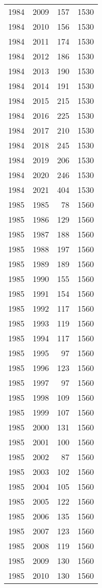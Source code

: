 \documentclass[
  11pt,
  letterpaper,
  DIV=11,
  numbers=noendperiod,
  twoside]{scrartcl}
\begin{document}
\begin{longtable}[]{@{}rrrr@{}}
1984 & 2009 & 157 & 1530 \\
1984 & 2010 & 156 & 1530 \\
1984 & 2011 & 174 & 1530 \\
1984 & 2012 & 186 & 1530 \\
1984 & 2013 & 190 & 1530 \\
1984 & 2014 & 191 & 1530 \\
1984 & 2015 & 215 & 1530 \\
1984 & 2016 & 225 & 1530 \\
1984 & 2017 & 210 & 1530 \\
1984 & 2018 & 245 & 1530 \\
1984 & 2019 & 206 & 1530 \\
1984 & 2020 & 246 & 1530 \\
1984 & 2021 & 404 & 1530 \\
1985 & 1985 & 78 & 1560 \\
1985 & 1986 & 129 & 1560 \\
1985 & 1987 & 188 & 1560 \\
1985 & 1988 & 197 & 1560 \\
1985 & 1989 & 189 & 1560 \\
1985 & 1990 & 155 & 1560 \\
1985 & 1991 & 154 & 1560 \\
1985 & 1992 & 117 & 1560 \\
1985 & 1993 & 119 & 1560 \\
1985 & 1994 & 117 & 1560 \\
1985 & 1995 & 97 & 1560 \\
1985 & 1996 & 123 & 1560 \\
1985 & 1997 & 97 & 1560 \\
1985 & 1998 & 109 & 1560 \\
1985 & 1999 & 107 & 1560 \\
1985 & 2000 & 131 & 1560 \\
1985 & 2001 & 100 & 1560 \\
1985 & 2002 & 87 & 1560 \\
1985 & 2003 & 102 & 1560 \\
1985 & 2004 & 105 & 1560 \\
1985 & 2005 & 122 & 1560 \\
1985 & 2006 & 135 & 1560 \\
1985 & 2007 & 123 & 1560 \\
1985 & 2008 & 119 & 1560 \\
1985 & 2009 & 130 & 1560 \\
1985 & 2010 & 130 & 1560 \\

\end{longtable}
\end{document}
